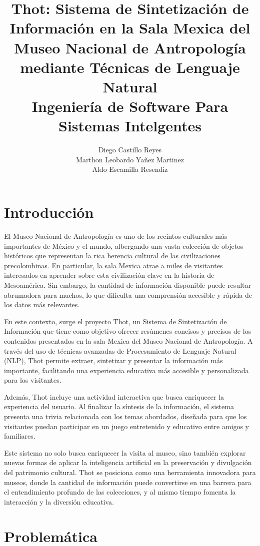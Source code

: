 \documentclass{report}
\title{\Huge{\textbf{Thot: Sistema de Sintetización de Información en la Sala Mexica del Museo Nacional de Antropología mediante Técnicas de Lenguaje Natural}}\\
\Large{\textbf{Ingeniería de Software Para Sistemas Intelgentes}}}
\author{Diego Castillo Reyes\\Marthon Leobardo Yañez Martinez\\Aldo Escamilla Resendiz}
\begin{document}
    \maketitle
    \tableofcontents
    \newpage
    \justifying 

    \section{Introducción}
        El Museo Nacional de Antropología es uno de los recintos culturales más importantes de México y el mundo, albergando una vasta colección de objetos históricos que representan la rica herencia cultural de las civilizaciones precolombinas. En particular, la sala Mexica atrae a miles de visitantes interesados en aprender sobre esta civilización clave en la historia de Mesoamérica. Sin embargo, la cantidad de información disponible puede resultar abrumadora para muchos, lo que dificulta una comprensión accesible y rápida de los datos más relevantes.

        En este contexto, surge el proyecto Thot, un Sistema de Sintetización de Información que tiene como objetivo ofrecer resúmenes concisos y precisos de los contenidos presentados en la sala Mexica del Museo Nacional de Antropología. A través del uso de técnicas avanzadas de Procesamiento de Lenguaje Natural (NLP), Thot permite extraer, sintetizar y presentar la información más importante, facilitando una experiencia educativa más accesible y personalizada para los visitantes.

        Además, Thot incluye una actividad interactiva que busca enriquecer la experiencia del usuario. Al finalizar la síntesis de la información, el sistema presenta una trivia relacionada con los temas abordados, diseñada para que los visitantes puedan participar en un juego entretenido y educativo entre amigos y familiares.

        Este sistema no solo busca enriquecer la visita al museo, sino también explorar nuevas formas de aplicar la inteligencia artificial en la preservación y divulgación del patrimonio cultural. Thot se posiciona como una herramienta innovadora para museos, donde la cantidad de información puede convertirse en una barrera para el entendimiento profundo de las colecciones, y al mismo tiempo fomenta la interacción y la diversión educativa.

    \section{Problemática}
    
\end{document}
